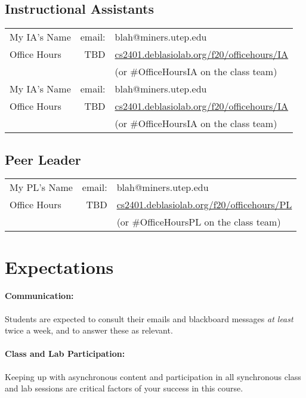 \documentclass[12pt]{scrartcl}
\newcommand{\change}[2]{#2}
\begin{document}
\subsection{Instructional Assistants}

\begin{tabular}{lrl}
\color{red}My IA's Name  
 & email: & blah@miners.utep.edu\\
\hspace{2em} Office Hours& TBD & \url{cs2401.deblasiolab.org/f20/officehours/IA}\\
& & (or \#OfficeHoursIA on the class team)\\

\color{red}My IA's Name  
 & email: & blah@miners.utep.edu\\
\hspace{2em} Office Hours& TBD & \url{cs2401.deblasiolab.org/f20/officehours/IA}\\
& & (or \#OfficeHoursIA on the class team)\\
\end{tabular}

\subsection{Peer Leader}

\begin{tabular}{lrl}
\color{red}My PL's Name  
 & email: & blah@miners.utep.edu\\
\hspace{2em} Office Hours& TBD & \url{cs2401.deblasiolab.org/f20/officehours/PL}\\
& & (or \#OfficeHoursPL on the class team)\\
\end{tabular}

\section{Expectations}

\paragraph{Communication:} Students are expected to consult their emails and blackboard messages \textit{at least} twice a week, and to answer these as relevant. 

\paragraph{Class and Lab Participation:} \change{Attendance }{Keeping up with asynchronous content} and participation in all \change{lecture}{synchronous class} and lab sessions are critical factors of your success in this course. 
\end{document}
